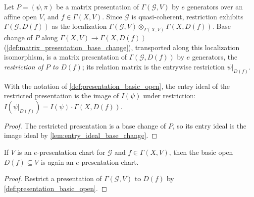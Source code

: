 \begin{definition}
  \label{def:presentation_basic_open}
  \leanok
  Let \(P = (\psi, \pi)\) be a matrix presentation of
  \(\Gamma(\mathcal G, V)\) by \(e\) generators over an affine open \(V\), and
  \(f \in \Gamma(X, V)\).  Since \(\mathcal G\) is quasi-coherent, restriction
  exhibits \(\Gamma(\mathcal G, D(f))\) as the localization
  \(\Gamma(\mathcal G, V) \otimes_{\Gamma(X, V)} \Gamma(X, D(f))\).  Base
  change of \(P\) along \(\Gamma(X, V) \to \Gamma(X, D(f))\)
  (\cref{def:matrix_presentation_base_change}), transported along this
  localization isomorphism, is a matrix presentation of
  \(\Gamma(\mathcal G, D(f))\) by \(e\) generators, the \emph{restriction of
  \(P\) to \(D(f)\)}; its relation matrix is the entrywise restriction
  \(\psi|_{D(f)}\).
\end{definition}

\begin{lemma}
  \label{lem:entry_ideal_basic_open}
  \leanok
  With the notation of \cref{def:presentation_basic_open}, the entry ideal of
  the restricted presentation is the image of \(I(\psi)\) under restriction:
  \(I(\psi|_{D(f)}) = I(\psi) \cdot \Gamma(X, D(f))\).
\end{lemma}

\begin{proof}
  \leanok
  The restricted presentation is a base change of \(P\), so its entry ideal is
  the image ideal by \cref{lem:entry_ideal_base_change}.
\end{proof}

\begin{lemma}
  \label{lem:presentation_chart_basic_open}
  \leanok
  If \(V\) is an \(e\)-presentation chart for \(\mathcal G\) and
  \(f \in \Gamma(X, V)\), then the basic open \(D(f) \subseteq V\) is again an
  \(e\)-presentation chart.
\end{lemma}

\begin{proof}
  \leanok
  Restrict a presentation of \(\Gamma(\mathcal G, V)\) to \(D(f)\) by
  \cref{def:presentation_basic_open}.
\end{proof}


